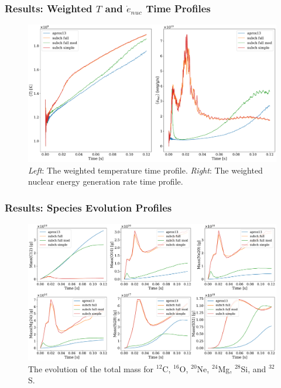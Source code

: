 \documentclass[
	11pt, %
]{beamer}
\begin{document}
\begin{frame}
\frametitle{Results: Weighted $T$ and $\dot{e}_{nuc}$ Time Profiles}
    \begin{figure}
        \centering
        \includegraphics[width=1\linewidth]{network_time_profile.pdf}
        \caption{{\it Left}: The weighted temperature time profile. {\it Right}: The weighted nuclear energy generation rate time profile.}
    \end{figure}
\end{frame}


\begin{frame}
\frametitle{Results: Species Evolution Profiles}
    \begin{figure}
        \centering
        \includegraphics[width=1\linewidth]{network_species_summary.pdf}
        \caption{The evolution of the total mass for ${}^{12}$C, ${}^{16}$O, ${}^{20}$Ne,  ${}^{24}$Mg, ${}^{28}$Si, and ${}^{32}$S.}
    \end{figure}
\end{frame}


    
\end{document}
